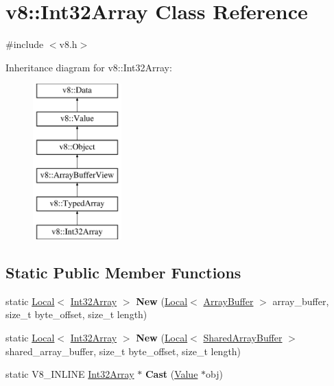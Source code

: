 \hypertarget{classv8_1_1Int32Array}{}\section{v8\+:\+:Int32\+Array Class Reference}
\label{classv8_1_1Int32Array}


{\ttfamily \#include $<$v8.\+h$>$}

Inheritance diagram for v8\+:\+:Int32\+Array\+:\begin{figure}[H]
\begin{center}
\leavevmode
\includegraphics[height=6.000000cm]{classv8_1_1Int32Array}
\end{center}
\end{figure}
\subsection*{Static Public Member Functions}
\begin{DoxyCompactItemize}
\item 
\hypertarget{classv8_1_1Int32Array_a03adbd44725e3325d10bcc448e8bfd75}{}static \hyperlink{classv8_1_1Local}{Local}$<$ \hyperlink{classv8_1_1Int32Array}{Int32\+Array} $>$ {\bfseries New} (\hyperlink{classv8_1_1Local}{Local}$<$ \hyperlink{classv8_1_1ArrayBuffer}{Array\+Buffer} $>$ array\+\_\+buffer, size\+\_\+t byte\+\_\+offset, size\+\_\+t length)\label{classv8_1_1Int32Array_a03adbd44725e3325d10bcc448e8bfd75}

\item 
\hypertarget{classv8_1_1Int32Array_acf112fc9df4e0bf2791be73264779905}{}static \hyperlink{classv8_1_1Local}{Local}$<$ \hyperlink{classv8_1_1Int32Array}{Int32\+Array} $>$ {\bfseries New} (\hyperlink{classv8_1_1Local}{Local}$<$ \hyperlink{classv8_1_1SharedArrayBuffer}{Shared\+Array\+Buffer} $>$ shared\+\_\+array\+\_\+buffer, size\+\_\+t byte\+\_\+offset, size\+\_\+t length)\label{classv8_1_1Int32Array_acf112fc9df4e0bf2791be73264779905}

\item 
\hypertarget{classv8_1_1Int32Array_afe7cdf534deadc3d872d8a43778809f1}{}static V8\+\_\+\+I\+N\+L\+I\+N\+E \hyperlink{classv8_1_1Int32Array}{Int32\+Array} $\ast$ {\bfseries Cast} (\hyperlink{classv8_1_1Value}{Value} $\ast$obj)\label{classv8_1_1Int32Array_afe7cdf534deadc3d872d8a43778809f1}

\end{DoxyCompactItemize}
